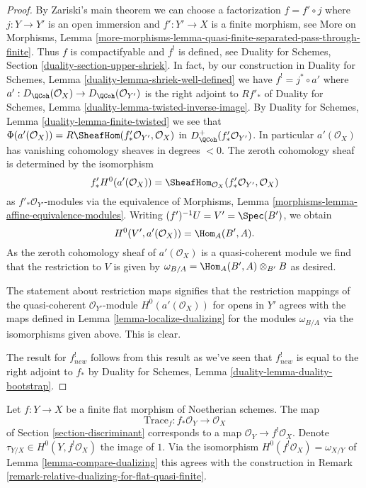 \begin{proof}
By Zariski's main theorem we can choose a factorization $f = f' \circ j$
where $j : Y \to Y'$ is an open immersion and $f' : Y' \to X$ is a finite
morphism, see More on Morphisms, Lemma
\ref{more-morphisms-lemma-quasi-finite-separated-pass-through-finite}.
Thus $f$ is compactifyable and $f^!$ is defined, see
Duality for Schemes, Section \ref{duality-section-upper-shriek}.
In fact, by our construction in
Duality for Schemes, Lemma \ref{duality-lemma-shriek-well-defined} we have
$f^! = j^* \circ a'$ where
$a' : D_\QCoh(\mathcal{O}_X) \to D_\QCoh(\mathcal{O}_{Y'})$
is the right adjoint to $Rf'_*$ of
Duality for Schemes, Lemma \ref{duality-lemma-twisted-inverse-image}.
By Duality for Schemes, Lemma \ref{duality-lemma-finite-twisted}
we see that
$\Phi(a'(\mathcal{O}_X)) = R\SheafHom(f'_*\mathcal{O}_{Y'}, \mathcal{O}_X)$ in
$D_\QCoh^+(f'_*\mathcal{O}_{Y'})$. In particular $a'(\mathcal{O}_X)$ has
vanishing cohomology sheaves in degrees $< 0$. The zeroth cohomology sheaf
is determined by the isomorphism
$$
f'_*H^0(a'(\mathcal{O}_X)) =
\SheafHom_{\mathcal{O}_X}(f'_*\mathcal{O}_{Y'}, \mathcal{O}_X)
$$
as $f'_*\mathcal{O}_{Y'}$-modules via the equivalence of
Morphisms, Lemma \ref{morphisms-lemma-affine-equivalence-modules}.
Writing $(f')^{-1}U = V' = \Spec(B')$, we obtain
$$
H^0(V', a'(\mathcal{O}_X)) = \Hom_A(B', A).
$$
As the zeroth cohomology sheaf of $a'(\mathcal{O}_X)$
is a quasi-coherent module we find that
the restriction to $V$ is given by
$\omega_{B/A} = \Hom_A(B', A) \otimes_{B'} B$ as desired.

\medskip\noindent
The statement about restriction maps signifies that the restriction mappings
of the quasi-coherent $\mathcal{O}_{Y'}$-module $H^0(a'(\mathcal{O}_X))$
for opens in $Y'$ agrees with the maps defined in
Lemma \ref{lemma-localize-dualizing}
for the modules $\omega_{B/A}$ via the isomorphisms given above.
This is clear.

\medskip\noindent
The result for $f_{new}^!$ follows from this result
as we've seen that $f_{new}^!$ is equal to the right adjoint to
$f_*$ by Duality for Schemes, Lemma \ref{duality-lemma-duality-bootstrap}.
\end{proof}

\begin{lemma}
\label{lemma-compare-trace}
Let $f : Y \to X$ be a finite flat morphism of Noetherian schemes.
The map
$$
\text{Trace}_f : f_*\mathcal{O}_Y \longrightarrow \mathcal{O}_X
$$
of Section \ref{section-discriminant}
corresponds to a map $\mathcal{O}_Y \to f^!\mathcal{O}_X$.
Denote $\tau_{Y/X} \in H^0(Y, f^!\mathcal{O}_X)$ the image of $1$.
Via the isomorphism $H^0(f^!\mathcal{O}_X) = \omega_{X/Y}$ of
Lemma \ref{lemma-compare-dualizing}
this agrees with the construction in
Remark \ref{remark-relative-dualizing-for-flat-quasi-finite}.
\end{lemma}

